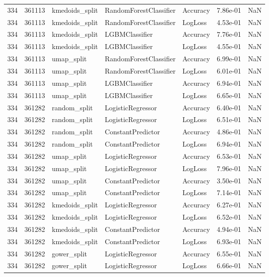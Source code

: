 \begin{tabular}{rrlllrr}
334 & 361113 & kmedoids\_split & RandomForestClassifier & Accuracy & 7.86e-01 & NaN \\
334 & 361113 & kmedoids\_split & RandomForestClassifier & LogLoss & 4.53e-01 & NaN \\
334 & 361113 & kmedoids\_split & LGBMClassifier & Accuracy & 7.76e-01 & NaN \\
334 & 361113 & kmedoids\_split & LGBMClassifier & LogLoss & 4.55e-01 & NaN \\
334 & 361113 & umap\_split & RandomForestClassifier & Accuracy & 6.99e-01 & NaN \\
334 & 361113 & umap\_split & RandomForestClassifier & LogLoss & 6.01e-01 & NaN \\
334 & 361113 & umap\_split & LGBMClassifier & Accuracy & 6.94e-01 & NaN \\
334 & 361113 & umap\_split & LGBMClassifier & LogLoss & 6.65e-01 & NaN \\
334 & 361282 & random\_split & LogisticRegressor & Accuracy & 6.40e-01 & NaN \\
334 & 361282 & random\_split & LogisticRegressor & LogLoss & 6.51e-01 & NaN \\
334 & 361282 & random\_split & ConstantPredictor & Accuracy & 4.86e-01 & NaN \\
334 & 361282 & random\_split & ConstantPredictor & LogLoss & 6.94e-01 & NaN \\
334 & 361282 & umap\_split & LogisticRegressor & Accuracy & 6.53e-01 & NaN \\
334 & 361282 & umap\_split & LogisticRegressor & LogLoss & 7.96e-01 & NaN \\
334 & 361282 & umap\_split & ConstantPredictor & Accuracy & 3.50e-01 & NaN \\
334 & 361282 & umap\_split & ConstantPredictor & LogLoss & 7.14e-01 & NaN \\
334 & 361282 & kmedoids\_split & LogisticRegressor & Accuracy & 6.27e-01 & NaN \\
334 & 361282 & kmedoids\_split & LogisticRegressor & LogLoss & 6.52e-01 & NaN \\
334 & 361282 & kmedoids\_split & ConstantPredictor & Accuracy & 4.94e-01 & NaN \\
334 & 361282 & kmedoids\_split & ConstantPredictor & LogLoss & 6.93e-01 & NaN \\
334 & 361282 & gower\_split & LogisticRegressor & Accuracy & 6.55e-01 & NaN \\
334 & 361282 & gower\_split & LogisticRegressor & LogLoss & 6.66e-01 & NaN \\

\end{tabular}
